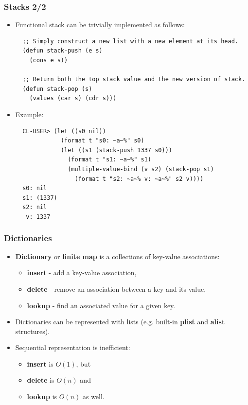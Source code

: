 \documentclass{beamer}
\begin{document}
\begin{frame}[fragile]
  \frametitle{Stacks 2/2}
  \begin{itemize}
  \item Functional stack can be trivially implemented as follows:
\begin{verbatim}
  ;; Simply construct a new list with a new element at its head.
  (defun stack-push (e s)
    (cons e s))

  ;; Return both the top stack value and the new version of stack.
  (defun stack-pop (s)
    (values (car s) (cdr s)))
\end{verbatim}
  \item Example:
\begin{verbatim}
  CL-USER> (let ((s0 nil))
             (format t "s0: ~a~%" s0)
             (let ((s1 (stack-push 1337 s0)))
               (format t "s1: ~a~%" s1)
               (multiple-value-bind (v s2) (stack-pop s1)
                 (format t "s2: ~a~% v: ~a~%" s2 v))))
  s0: nil
  s1: (1337)
  s2: nil
   v: 1337
\end{verbatim}    
  \end{itemize}
\end{frame}

\begin{frame}[fragile]
  \frametitle{Dictionaries}
  \begin{itemize}
  \item \textbf{Dictionary} or \textbf{finite map} is a collections of key-value
    associations:
    \begin{itemize}
    \item \textbf{insert} - add a key-value association,
    \item \textbf{delete} - remove an association between a key and its value,
    \item \textbf{lookup} - find an associated value for a given key.
    \end{itemize}
  \item Dictionaries can be represented with lists (e.g. built-in \textbf{plist}
    and \textbf{alist} structures).
  \item Sequential representation is inefficient:
    \begin{itemize}
    \item \textbf{insert} is $O(1)$, but
    \item \textbf{delete} is $O(n)$ and
    \item \textbf{lookup} is $O(n)$ as well.
    \end{itemize}
  \end{itemize}
\end{frame}
\end{document}
